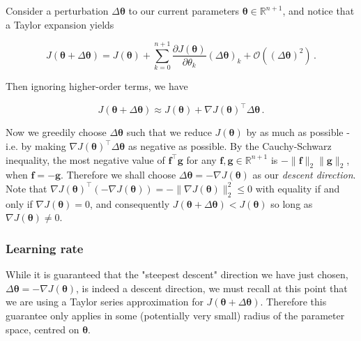 \documentclass{article}[11pt]
\begin{document}
            Consider a perturbation $\Delta \boldsymbol{\theta}$ to our current parameters $\boldsymbol{\theta} \in \mathbb{R}^{n+1}$, and notice that a Taylor expansion yields
            
            $$
            J(\boldsymbol{\theta} + \Delta \boldsymbol{\theta}) = J(\boldsymbol{\theta}) + \sum_{k=0}^{n+1} \frac{\partial J(\boldsymbol{\theta})}{\partial \theta_k} (\Delta \boldsymbol{\theta})_k + \mathcal{O} ((\Delta \boldsymbol{\theta})^2) \,.
            $$
            
            Then ignoring higher-order terms, we have
            
            $$
            J(\boldsymbol{\theta} + \Delta \boldsymbol{\theta}) \approx J(\boldsymbol{\theta}) + \nabla J(\boldsymbol{\theta})^\top \Delta \boldsymbol{\theta} \,.
            $$
            
            Now we greedily choose $\Delta \boldsymbol{\theta}$ such that we reduce $J(\boldsymbol{\theta})$ by as much as possible - i.e. by making $\nabla J(\boldsymbol{\theta})^\top \Delta \boldsymbol{\theta}$ as negative as possible. By the Cauchy-Schwarz inequality, the most negative value of $\mathbf{f}^\top \mathbf{g}$ for any $\mathbf{f}, \mathbf{g} \in \mathbb{R}^{n+1}$ is $- \lVert \mathbf{f} \rVert_2 \lVert \mathbf{g} \rVert_2$, when $\mathbf{f} = -\mathbf{g}$. Therefore we shall choose $\Delta \boldsymbol{\theta} = - \nabla J(\boldsymbol{\theta})$ as our \textit{descent direction}. Note that $\nabla J(\boldsymbol{\theta})^\top (- \nabla J(\boldsymbol{\theta})) = -\lVert \nabla J(\boldsymbol{\theta}) \rVert_2^2 \leq 0$ with equality if and only if $\nabla J(\boldsymbol{\theta}) = 0$, and consequently $J(\boldsymbol{\theta} + \Delta \boldsymbol{\theta}) < J(\boldsymbol{\theta})$ so long as $\nabla J(\boldsymbol{\theta}) \neq 0$.
        
    
        
        \subsubsection{Learning rate}
            
            While it is guaranteed that the "steepest descent" direction we have just chosen, $\Delta \boldsymbol{\theta} = - \nabla J(\boldsymbol{\theta})$, is indeed a descent direction, we must recall at this point that we are using a Taylor series approximation for $J(\boldsymbol{\theta} + \Delta \boldsymbol{\theta})$. Therefore this guarantee only applies in some (potentially very small) radius of the parameter space, centred on $\boldsymbol{\theta}$.
            
\end{document}
